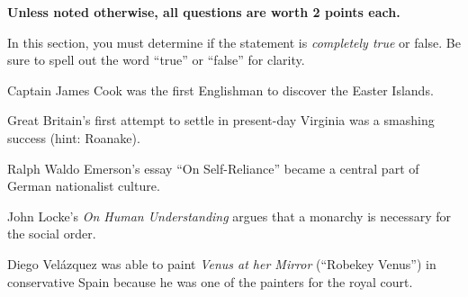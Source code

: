 \documentclass[12pt]{examdesign}
\begin{document}
\begin{exampreface}
	\textbf{Unless noted otherwise, all questions are worth 2 points each.}
\end{exampreface}

\begin{truefalse}[title={Statements}]
	In this section, you must determine if the statement is \emph{completely true} or false. Be sure to spell out the word ``true'' or ``false'' for clarity. 

	\begin{question}
		 Captain James Cook was the first Englishman to discover the Easter Islands.
	\end{question}

	\begin{question}
		 Great Britain's first attempt to settle in present-day Virginia was a smashing success (hint: Roanake).
	\end{question}

	\begin{question}
		 Ralph Waldo Emerson's essay ``On Self-Reliance'' became a central part of German nationalist culture.
	\end{question}

	\begin{question}
		 John Locke's \emph{On Human Understanding} argues that a monarchy is necessary for the social order.
	\end{question}

	\begin{question}
		 Diego Vel\'{a}zquez was able to paint \emph{Venus at her Mirror} (``Robekey Venus'') in conservative Spain because he was one of the painters for the royal court.
	\end{question}
\end{truefalse}
\end{document}
